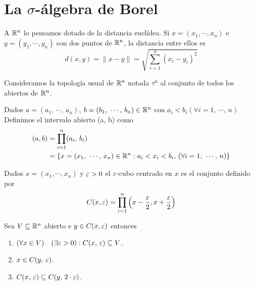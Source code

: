\section{La $\sigma$-álgebra de Borel}
\label{sec:borel}

A $\mathbb{R}^n$ lo pensamos dotado de la distancia euclídea.
Si $x = (x_1, \cdots, x_n)$ e $y = (y_1, \cdots, y_n)$ son dos puntos de $\mathbb{R}^n$, la distancia
entre ellos es
\begin{equation*}
    d(x, y) = \|x-y\| = \sqrt{ \sum_{i=1}^n (x_i - y_i)^2 }
\end{equation*}

Consideramos la topología usual de $\mathbb{R}^n$ notada $\tau^n$ al conjunto de todos los abiertos de $\mathbb{R}^n$.

\begin{definition}
    Dados $a = (a_1\text{, } \cdots\text{, } a_n)$, $b = (b_1\text{, } \cdots\text{, } b_n) \in \mathbb{R}^n$ con $a_i < b_i (\forall i = 1 \text{, } \cdots \text{, } n)$
    Definimos el intervalo abierto (a, b) como
    \begin{align*}
        (a, b) & = \prod_{i=1}^n (a_i\text{, } b_i)                                                                                                \\
               & = \{ x = (x_1\text{, } \cdots \text{, } x_n) \in \mathbb{R}^n : a_i < x_i < b_i \text{, } (\forall i = 1 \text{, } \cdots \text{, } n) \}
    \end{align*}
\end{definition}

\begin{definition}[$\e$-cubo]
    Dados $x= (x_1, \cdots, x_n)$ y $\varepsilon > 0$ el $\e$-cubo centrado en $x$ es el conjunto definido por
    \begin{equation*}
        C(x, \varepsilon) = \prod_{i = 1}^n \left(x - \frac{\varepsilon}{2}, x + \frac{\varepsilon}{2}\right)
    \end{equation*}
\end{definition}

\begin{prop}
    Sea $V \subseteq \mathbb{R}^n$ abierto e $y \in C(x, \varepsilon)$ entonces
    \begin{enumerate}
        \item $(\forall x \in V) \quad (\exists \varepsilon > 0) : C(x \text{, } \varepsilon) \subseteq V$.
        \item $x \in C(y\text{, } \varepsilon)$.
        \item $C(x\text{, } \varepsilon) \subseteq C(y\text{, } 2 \cdot \varepsilon)$.
    \end{enumerate}
\end{prop}

